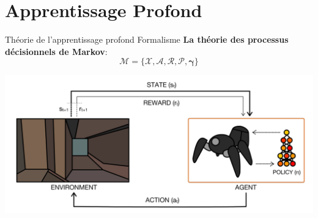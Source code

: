 
\newcommand{\mf}[1]{\mathcal{#1}}

\section{Apprentissage Profond}
\begin{frame}{Théorie de l'apprentissage profond}
Formalisme \textbf{La théorie des processus décisionnels de Markov}:
\[
    \bm{\mf{M} = \bigg\{\mf{X}, \mf{A}, \mf{R}, \mf{P}, \gamma\bigg\} }
\]

\begin{center}
    \includegraphics[scale=.2]{./reinforcementlearning/rl}
\end{center}

\end{frame}


